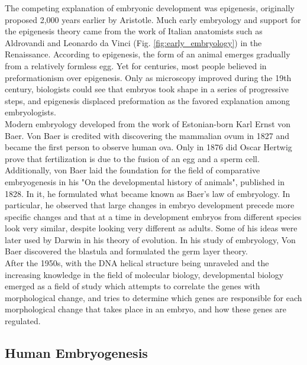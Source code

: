 The competing explanation of embryonic development was epigenesis, originally proposed 2,000 years earlier by Aristotle. 
Much early embryology and support for the epigenesis theory came from the work of Italian anatomists such as Aldrovandi and Leonardo da Vinci (Fig. \ref{fig:early_embryology}) in the Renaissance.
According to epigenesis, the form of an animal emerges gradually from a relatively formless egg. 
Yet for centuries, most people believed in preformationism over epigenesis.
Only as microscopy improved during the 19th century, biologists could see that embryos took shape in a series of progressive steps, and epigenesis displaced preformation as the favored explanation among embryologists.\\


Modern embryology developed from the work of Estonian-born Karl Ernst von Baer.
Von Baer is credited with discovering the mammalian ovum in 1827 and became the first person to observe human ova.
Only in 1876 did Oscar Hertwig prove that fertilization is due to the fusion of an egg and a sperm cell.
Additionally, von Baer laid the foundation for the field of comparative embryogenesis in his "On the developmental history of animals", published in 1828.
In it, he formulated what became known as Baer's law of embryology.
In particular, he observed that large changes in embryo development precede more specific changes and that at a time in development embryos from different species look very similar, despite looking very different as adults.
Some of his ideas were later used by Darwin in his theory of evolution.
In his study of embryology, Von Baer discovered the blastula and formulated the germ layer theory.\\

After the 1950s, with the DNA helical structure being unraveled and the increasing knowledge in the field of molecular biology, developmental biology emerged as a field of study which attempts to correlate the genes with morphological change, and tries to determine which genes are responsible for each morphological change that takes place in an embryo, and how these genes are regulated.

\subsection{Human Embryogenesis}
\label{sec:human_embryogenesis}


